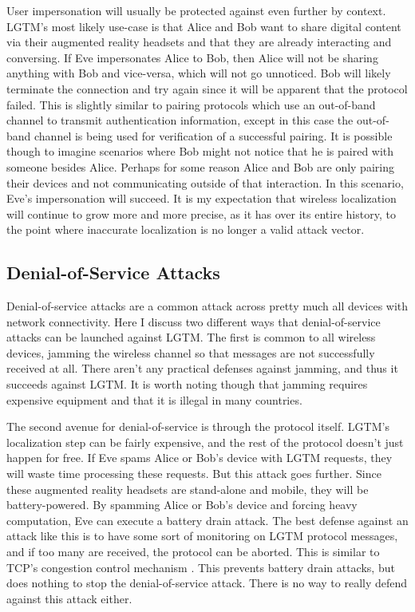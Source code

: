\documentclass[12pt]{report}
\begin{document}
User impersonation will usually be protected against even further by context. LGTM's most likely use-case is that Alice and Bob want to share digital content via their augmented reality headsets and that they are already interacting and conversing. If Eve impersonates Alice to Bob, then Alice will not be sharing anything with Bob and vice-versa, which will not go unnoticed. Bob will likely terminate the connection and try again since it will be apparent that the protocol failed. This is slightly similar to pairing protocols which use an out-of-band channel to transmit authentication information, except in this case the out-of-band channel is being used for verification of a successful pairing. It is possible though to imagine scenarios where Bob might not notice that he is paired with someone besides Alice. Perhaps for some reason Alice and Bob are only pairing their devices and not communicating outside of that interaction. In this scenario, Eve's impersonation will succeed. It is my expectation that wireless localization will continue to grow more and more precise, as it has over its entire history, to the point where inaccurate localization is no longer a valid attack vector. \par

\subsection{Denial-of-Service Attacks}
Denial-of-service attacks are a common attack across pretty much all devices with network connectivity. Here I discuss two different ways that denial-of-service attacks can be launched against LGTM. The first is common to all wireless devices, jamming the wireless channel so that messages are not successfully received at all. There aren't any practical defenses against jamming, and thus it succeeds against LGTM. It is worth noting though that jamming requires expensive equipment and that it is illegal in many countries. \par

The second avenue for denial-of-service is through the protocol itself. LGTM's localization step can be fairly expensive, and the rest of the protocol doesn't just happen for free. If Eve spams Alice or Bob's device with LGTM requests, they will waste time processing these requests. But this attack goes further. Since these augmented reality headsets are stand-alone and mobile, they will be battery-powered. By spamming Alice or Bob's device and forcing heavy computation, Eve can execute a battery drain attack. The best defense against an attack like this is to have some sort of monitoring on LGTM protocol messages, and if too many are received, the protocol can be aborted. This is similar to TCP's congestion control mechanism \cite{TcpCongestionControl2009}. This prevents battery drain attacks, but does nothing to stop the denial-of-service attack. There is no way to really defend against this attack either. \par
\end{document}
